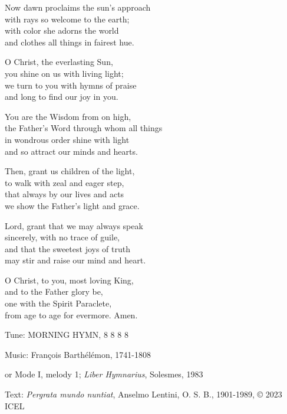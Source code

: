 \hymn

\begin{hymnverse}
Now dawn proclaims the sun’s approach\\
with rays so welcome to the earth;\\
with color she adorns the world\\
and clothes all things in fairest hue.

O Christ, the everlasting Sun,\\
you shine on us with living light;\\
we turn to you with hymns of praise\\
and long to find our joy in you.

You are the Wisdom from on high,\\
the Father’s Word through whom all things\\
in wondrous order shine with light\\
and so attract our minds and hearts.

Then, grant us children of the light,\\
to walk with zeal and eager step,\\
that always by our lives and acts\\
we show the Father’s light and grace.

Lord, grant that we may always speak\\
sincerely, with no trace of guile,\\
and that the sweetest joys of truth\\
may stir and raise our mind and heart.

O Christ, to you, most loving King,\\
and to the Father glory be,\\
one with the Spirit Paraclete,\\
from age to age for evermore. Amen.
\end{hymnverse}

\begin{hymnsource}
Tune: MORNING HYMN, 8 8 8 8

Music: François Barthélémon, 1741-1808

or Mode I, melody 1; \emph{Liber Hymnarius}, Solesmes, 1983

Text: \emph{Pergrata mundo nuntiat}, Anselmo Lentini, O. S. B., 1901-1989, © 2023 ICEL
\end{hymnsource}